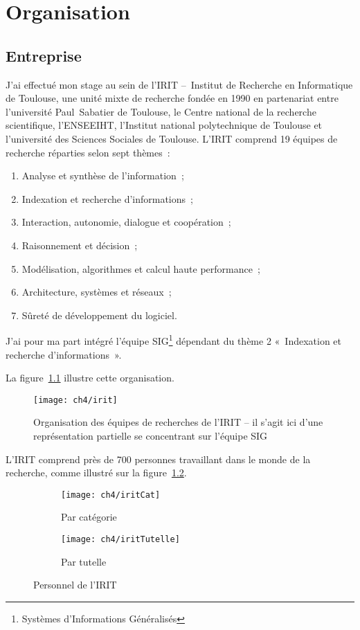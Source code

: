 \cleardoublepage
{}

\chapter{Organisation}


\section{Entreprise}
	J'ai effectué mon stage au sein de l'IRIT --~Institut de Recherche en Informatique de Toulouse, une unité mixte de recherche fondée en 1990 en partenariat entre l'université Paul~Sabatier de Toulouse, le Centre national de la recherche scientifique, l'ENSEEIHT, l'Institut national polytechnique de Toulouse et l’université des Sciences Sociales de Toulouse. L'IRIT comprend 19 équipes de recherche réparties selon sept thèmes~:
	\begin{enumerate}
		\item Analyse et synthèse de l’information~;
		\item Indexation et recherche d’informations~;
		\item Interaction, autonomie, dialogue et coopération~;
		\item Raisonnement et décision~;
		\item Modélisation, algorithmes et calcul haute performance~;
		\item Architecture, systèmes et réseaux~;
		\item Sûreté de développement du logiciel.
	\end{enumerate}
	
	J'ai pour ma part intégré l'équipe SIG\footnote{Systèmes d’Informations Généralisés} dépendant du thème 2 «~Indexation et recherche d’informations~».
	
	La figure~\ref{fig:irit} illustre cette organisation.
	
	\begin{figure}[h]
		\centering
		\texttt{[image: ch4/irit]}
		\caption{Organisation des équipes de recherches de l'IRIT -- il s'agit ici d'une représentation partielle se concentrant sur l'équipe SIG}\label{fig:irit}
	\end{figure}
	
	L'IRIT comprend près de 700 personnes travaillant dans le monde de la recherche, comme illustré sur la figure~\ref{fig:iritDiag}.
	
	\begin{figure}[h]
		\centering
		\begin{subfigure}[b]{0.45\textwidth}
			\centering
			\texttt{[image: ch4/iritCat]}
			\caption{Par catégorie}
		\end{subfigure}
		\begin{subfigure}[b]{0.45\textwidth}
			\centering
			\texttt{[image: ch4/iritTutelle]}
			\caption{Par tutelle}
		\end{subfigure}
		\caption{Personnel de l'IRIT \citep{irit}}\label{fig:iritDiag}
	\end{figure}


